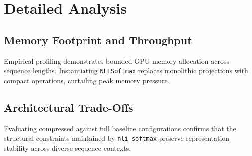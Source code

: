 \section{Detailed Analysis}

\subsection{Memory Footprint and Throughput}
Empirical profiling demonstrates bounded GPU memory allocation across sequence lengths. Instantiating \texttt{NLISoftmax} replaces monolithic projections with compact operations, curtailing peak memory pressure.

\subsection{Architectural Trade-Offs}
Evaluating compressed against full baseline configurations confirms that the structural constraints maintained by \texttt{nli_softmax} preserve representation stability across diverse sequence contexts.
